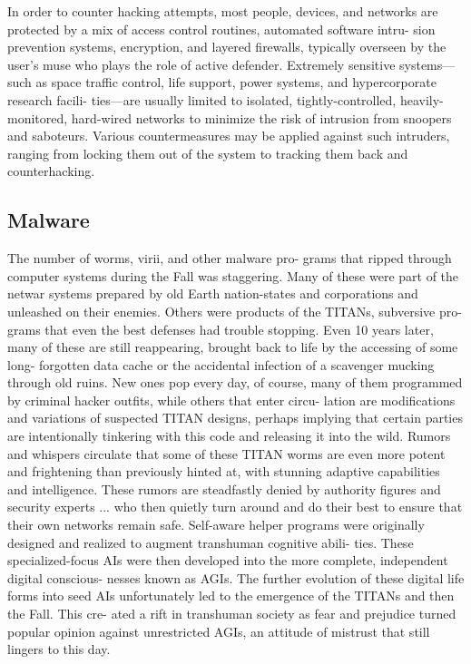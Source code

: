 In order to counter hacking attempts, most people, 
devices, and networks are protected by a mix of 
access control routines, automated software intru-
sion prevention systems, encryption, and layered 
firewalls, typically overseen by the user's muse who 
plays the role of active defender. Extremely sensitive 
systems—such as space traffic control, life support, 
power systems, and hypercorporate research facili-
ties—are usually limited to isolated, tightly-controlled, 
heavily-monitored, hard-wired networks to minimize 
the risk of intrusion from snoopers and saboteurs. 
Various countermeasures may be applied against 
such intruders, ranging from locking them out of the 
system to tracking them back and counterhacking.

\subsection{Malware}

The number of worms, virii, and other malware pro-
grams that ripped through computer systems during 
the Fall was staggering. Many of these were part of 
the netwar systems prepared by old Earth nation-states 
and corporations and unleashed on their enemies. 
Others were products of the TITANs, subversive pro-
grams that even the best defenses had trouble stopping. 
Even 10 years later, many of these are still reappearing, 
brought back to life by the accessing of some long-
forgotten data cache or the accidental infection of a 
scavenger mucking through old ruins. New ones pop 
every day, of course, many of them programmed by 
criminal hacker outfits, while others that enter circu-
lation are modifications and variations of suspected 
TITAN designs, perhaps implying that certain parties 
are intentionally tinkering with this code and releasing 
it into the wild. Rumors and whispers circulate that 
some of these TITAN worms are even more potent and 
frightening than previously hinted at, with stunning 
adaptive capabilities and intelligence. These rumors 
are steadfastly denied by authority figures and security 
experts ... who then quietly turn around and do their 
best to ensure that their own networks remain safe.
Self-aware helper programs were originally designed 
and realized to augment transhuman cognitive abili-
ties. These specialized-focus AIs were then developed 
into the more complete, independent digital conscious-
nesses known as AGIs. The further evolution of these 
digital life forms into seed AIs unfortunately led to the 
emergence of the TITANs and then the Fall. This cre-
ated a rift in transhuman society as fear and prejudice 
turned popular opinion against unrestricted AGIs, an 
attitude of mistrust that still lingers to this day.


